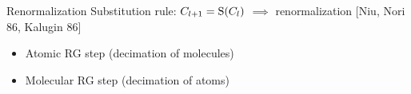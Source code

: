 \begin{frame}{Renormalization}
Substitution rule: $C_{l+1} = \operatorname{S}(C_l)$ $\implies$ renormalization [Niu, Nori 86, Kalugin \etal{} 86]
	\begin{itemize}
	\item Atomic RG step (decimation of molecules) 
	
	{\centering
	
	}
	
	\item Molecular RG step (decimation of atoms) 
	
	{\centering
	
	}
	
	\end{itemize}

\end{frame}

